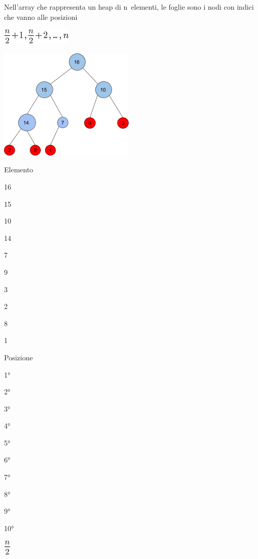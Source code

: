 \documentclass{article}
\begin{document}
{Nell'array che rappresenta un heap di }{n}{~elementi, le foglie sono i
nodi con indici che vanno alle posizioni}

{}

\includegraphics{images/image123.png}

{}

{\includegraphics{images/image526.png}}

{}

\protect\hypertarget{t.0db836340677fe77e6dcdbae821987d7a7a9aed8}{}{}\protect\hypertarget{t.15}{}{}

{Elemento}

{16}

{15}

{10}

{14}

{7}

{9}

{3}

{2}

{8}

{1}

{Posizione}

{1°}

{2°}

{3°}

{4°}

{5°}

{6°}

{7°}

{8°}

{9°}

{10°}

{}

{}

{}

{}

\includegraphics{images/image124.png}
\end{document}
